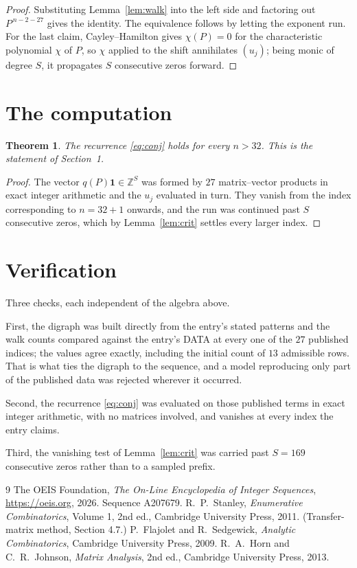 \documentclass[11pt,a4paper]{article}
\theoremstyle{plain}
\newtheorem{theorem}{Theorem}
\theoremstyle{definition}
\begin{document}
\begin{proof}
Substituting Lemma~\ref{lem:walk} into the left side and factoring out
$P^{\,n-2-27}$ gives the identity. The equivalence follows by letting the exponent
run. For the last claim, Cayley--Hamilton gives $\chi(P)=0$ for the characteristic
polynomial $\chi$ of $P$, so $\chi$ applied to the shift annihilates $(u_j)$; being monic of
degree $S$, it propagates $S$ consecutive zeros forward.
\end{proof}

\section{The computation}

\begin{theorem}
The recurrence \eqref{eq:conj} holds for every $n>32$. This is the statement of
Section~1.
\end{theorem}

\begin{proof}
The vector $q(P)\mathbf{1}\in\mathbb{Z}^{S}$ was formed by $27$ matrix--vector
products in exact integer arithmetic and the $u_j$ evaluated in turn. They vanish from the
index corresponding to $n=32+1$ onwards, and the run was continued past $S$ consecutive
zeros, which by Lemma~\ref{lem:crit} settles every larger index.
\end{proof}

\section{Verification}

Three checks, each independent of the algebra above.

First, the digraph was built directly from the entry's stated patterns and the walk counts
compared against the entry's DATA at every one of the $27$ published indices; the
values agree exactly, including the initial count of $13$ admissible rows. That is
what ties the digraph to the sequence, and a model reproducing only part of the published
data was rejected wherever it occurred.

Second, the recurrence \eqref{eq:conj} was evaluated on those published terms in exact
integer arithmetic, with no matrices involved, and vanishes at every index the entry claims.

Third, the vanishing test of Lemma~\ref{lem:crit} was carried past $S=169$ consecutive
zeros rather than to a sampled prefix.

\begin{thebibliography}{9}
 The OEIS Foundation, \emph{The On-Line Encyclopedia of Integer
Sequences}, \url{https://oeis.org}, 2026. Sequence A207679.
 R.~P.~Stanley, \emph{Enumerative Combinatorics}, Volume 1, 2nd ed.,
Cambridge University Press, 2011. (Transfer-matrix method, Section 4.7.)
 P.~Flajolet and R.~Sedgewick, \emph{Analytic Combinatorics}, Cambridge
University Press, 2009.
 R.~A.~Horn and C.~R.~Johnson, \emph{Matrix Analysis}, 2nd ed., Cambridge
University Press, 2013.
\end{thebibliography}
\end{document}
